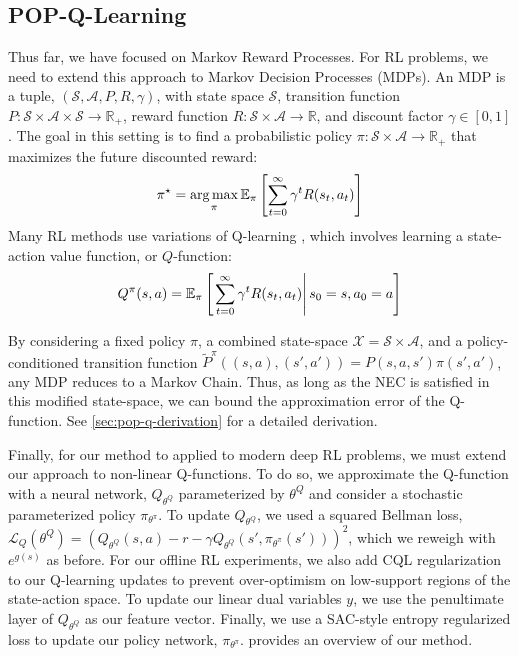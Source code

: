 \subsection{POP-Q-Learning}\label{sec:popq}\label{sec:pop-q-derivation}

Thus far, we have focused on Markov Reward Processes.
For RL problems, we need to extend this approach to Markov Decision Processes (MDPs).
An MDP is a tuple, $(\mathcal{S}, \mathcal{A}, P, R, \gamma)$, with state space $\mathcal S$, transition function $P : \mathcal{S} \times \mathcal{A} \times \mathcal{S} \to \mathbb{R}_+$, reward function $R : \mathcal S \times \mathcal{A} \to \mathbb R$, and discount factor $\gamma \in [0, 1]$.
The goal in this setting is to find a probabilistic policy $\pi : \mathcal{S} \times \mathcal{A} \to \mathbb{R}_+$ that maximizes the future discounted reward:
\begin{equation}
  \pi^\star = \operatorname*{arg\,max}_\pi \mathbb{E}_\pi \left [ \sum_{t=0}^\infty \gamma^t R(s_t, a_t) \right ]
\end{equation}
Many RL methods use variations of Q-learning \cite{watkins1992q,mnih2015humanlevel,haarnoja2018soft,kumar2020cql}, which involves learning a state-action value function, or $Q$-function:
\begin{equation}
  Q^\pi(s, a) = \mathbb{E}_\pi \left[\left.\sum_{t=0}^\infty \gamma^t R(s_t, a_t) \right| s_0 = s, a_0 = a \right]
\end{equation}

By considering a fixed policy $\pi$, a combined state-space $\mathcal{X} = \mathcal{S} \times \mathcal{A}$, and a policy-conditioned transition function $\tilde{P}^\pi((s, a), (s', a')) = P(s, a, s') \pi(s', a')$, any MDP reduces to a Markov Chain.
Thus, as long as the NEC is satisfied in this modified state-space, we can bound the approximation error of the Q-function.
See \cref{sec:pop-q-derivation} for a detailed derivation.

Finally, for our method to applied to modern deep RL problems, we must extend our approach to non-linear Q-functions.
To do so, we approximate the Q-function with a neural network, $Q_{\theta^Q}$ parameterized by $\theta^Q$ and consider a stochastic parameterized policy $\pi_{\theta^\pi}$.
To update $Q_{\theta^Q}$, we used a squared Bellman loss, $\mathcal{L}_Q(\theta^Q) = (Q_{\theta^Q}(s, a) - r - \gamma Q_{\theta^Q}(s', \pi_{\theta^\pi}(s')))^2$, which we reweigh with $e^{g(s)}$ as before.
For our offline RL experiments, we also add CQL regularization \citep{kumar2020cql} to our Q-learning updates to prevent over-optimism on low-support regions of the state-action space.
To update our linear dual variables $y$, we use the penultimate layer of $Q_{\theta^Q}$ as our feature vector.
Finally, we use a SAC-style entropy regularized loss to update our policy network, $\pi_{\theta^\pi}$.
 provides an overview of our method.


